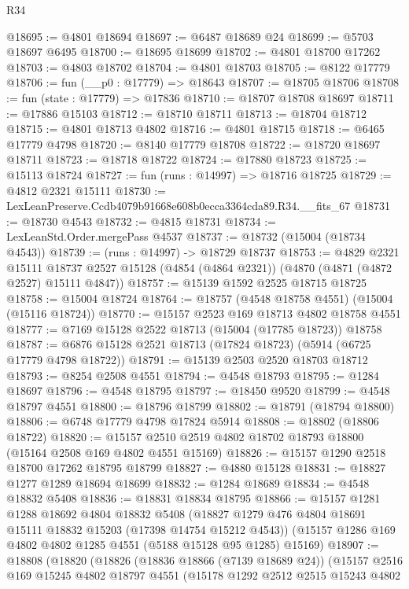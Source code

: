 \begin{lexlean}{R34}
\begin{coremodule}
@18695 := @4801 @18694
@18697 := @6487 @18689 @24
@18699 := @5703 @18697 @6495
@18700 := @18695 @18699
@18702 := @4801 @18700 @17262
@18703 := @4803 @18702
@18704 := @4801 @18703
@18705 := @8122 @17779
@18706 := fun (__p0 : @17779) => @18643
@18707 := @18705 @18706
@18708 := fun (state : @17779) => @17836
@18710 := @18707 @18708 @18697
@18711 := @17886 @15103
@18712 := @18710 @18711
@18713 := @18704 @18712
@18715 := @4801 @18713 @4802
@18716 := @4801 @18715
@18718 := @6465 @17779 @4798
@18720 := @8140 @17779 @18708
@18722 := @18720 @18697 @18711
@18723 := @18718 @18722
@18724 := @17880 @18723
@18725 := @15113 @18724
@18727 := fun (runs : @14997) => @18716 @18725
@18729 := @4812 @2321 @15111
@18730 := LexLeanPreserve.Ccdb4079b91668e608b0ecca3364cda89.R34.__fits_67
@18731 := @18730 @4543
@18732 := @4815 @18731
@18734 := LexLeanStd.Order.mergePass @4537
@18737 := @18732 (@15004 (@18734 @4543))
@18739 := (runs : @14997) -> @18729 @18737
@18753 := @4829
    @2321
    @15111
    @18737
    @2527
    @15128
    (@4854 (@4864 @2321))
    (@4870 (@4871 (@4872 @2527) @15111 @4847))
@18757 := @15139 @1592 @2525 @18715 @18725
@18758 := @15004 @18724
@18764 := @18757 (@4548 @18758 @4551) (@15004 (@15116 @18724))
@18770 := @15157 @2523 @169 @18713 @4802 @18758 @4551
@18777 := @7169 @15128 @2522 @18713 (@15004 (@17785 @18723)) @18758
@18787 := @6876 @15128 @2521 @18713 (@17824 @18723) (@5914 (@6725 @17779 @4798 @18722))
@18791 := @15139 @2503 @2520 @18703 @18712
@18793 := @8254 @2508 @4551
@18794 := @4548 @18793
@18795 := @1284 @18697
@18796 := @4548 @18795
@18797 := @18450 @9520
@18799 := @4548 @18797 @4551
@18800 := @18796 @18799
@18802 := @18791 (@18794 @18800)
@18806 := @6748 @17779 @4798 @17824 @5914
@18808 := @18802 (@18806 @18722)
@18820 := @15157 @2510 @2519 @4802 @18702 @18793 @18800 (@15164 @2508 @169 @4802 @4551 @15169)
@18826 := @15157 @1290 @2518 @18700 @17262 @18795 @18799
@18827 := @4880 @15128
@18831 := @18827 @1277 @1289 @18694 @18699
@18832 := @1284 @18689
@18834 := @4548 @18832 @5408
@18836 := @18831 @18834 @18795
@18866 := @15157
    @1281
    @1288
    @18692
    @4804
    @18832
    @5408
    (@18827 @1279 @476 @4804 @18691 @15111 @18832 @15203 (@17398 @14754 @15212 @4543))
    (@15157 @1286 @169 @4802 @4802 @1285 @4551 (@5188 @15128 @95 @1285) @15169)
@18907 := @18808
    (@18820
      (@18826
        (@18836 @18866 (@7139 @18689 @24))
        (@15157
          @2516
          @169
          @15245
          @4802
          @18797
          @4551
          (@15178
            @1292
            @2512
            @2515
            @15243
            @4802

\end{coremodule}
\end{lexlean}
